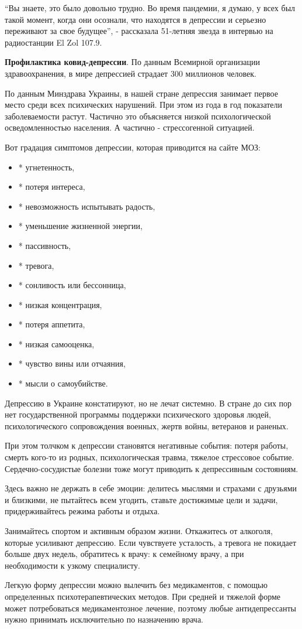 \enquote{Вы знаете, это было довольно трудно. Во время пандемии, я думаю, у всех
был такой момент, когда они осознали, что находятся в депрессии и серьезно
переживают за свое будущее}, - рассказала 51-летняя звезда в интервью на
радиостанции El Zol 107.9.

\textbf{Профилактика ковид-депрессии}. По данным Всемирной организации
здравоохранения, в мире депрессией страдает 300 миллионов человек.

По данным Минздрава Украины, в нашей стране депрессия занимает первое
место среди всех психических нарушений. При этом из года в год показатели
заболеваемости растут. Частично это объясняется низкой психологической
осведомленностью населения. А частично - стрессогенной ситуацией.

Вот градация симптомов депрессии, которая приводится на сайте МОЗ:

\begin{itemize}
  \item * угнетенность,
  \item * потеря интереса,
  \item * невозможность испытывать радость,
  \item * уменьшение жизненной энергии,
  \item * пассивность,
  \item * тревога,
  \item * сонливость или бессонница,
  \item * низкая концентрация,
  \item * потеря аппетита,
  \item * низкая самооценка,
  \item * чувство вины или отчаяния,
  \item * мысли о самоубийстве.
\end{itemize}

Депрессию в Украине констатируют, но не лечат системно. В стране до сих
пор нет государственной программы поддержки психического здоровья людей,
психологического сопровождения военных, жертв войны, ветеранов и раненых.

При этом толчком к депрессии становятся негативные события: потеря работы,
смерть кого-то из родных, психологическая травма, тяжелое стрессовое
событие. Сердечно-сосудистые болезни тоже могут приводить к депрессивным
состояниям.

Здесь важно не держать в себе эмоции: делитесь мыслями и страхами с
друзьями и близкими, не пытайтесь всем угодить, ставьте достижимые цели и
задачи, придерживайтесь режима работы и отдыха.

Занимайтесь спортом и активным образом жизни. Откажитесь от алкоголя,
которые усиливают депрессию. Если чувствуете усталость, а тревога не
покидает больше двух недель, обратитесь к врачу: к семейному врачу, а при
необходимости к узкому специалисту.

Легкую форму депрессии можно вылечить без медикаментов, с помощью определенных
психотерапевтических методов. При средней и тяжелой форме может потребоваться
медикаментозное лечение, поэтому любые антидепрессанты нужно принимать
исключительно по назначению врача. 

